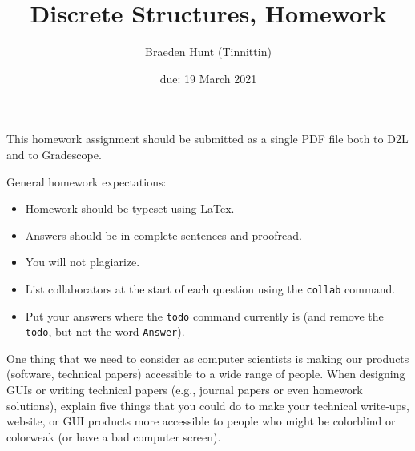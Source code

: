 \documentclass{article}
\title{Discrete Structures, Homework \hwnum}
\author{Braeden Hunt (Tinnittin)}
\date{due: 19 March 2021}
\begin{document}
\maketitle

This homework assignment should be
submitted as a single PDF file both to D2L and to Gradescope.

General homework expectations:
\begin{itemize}
    \item Homework should be typeset using LaTex.
    \item Answers should be in complete sentences and proofread.
    \item You will not plagiarize.
    \item List collaborators at the start of each question using the \texttt{collab} command.
    \item Put your answers where the \texttt{todo} command currently is (and
        remove the \texttt{todo}, but not the word \texttt{Answer}).
\end{itemize}


 

One thing that we need to consider as computer scientists is making our products
(software, technical papers) accessible to a wide range of people. When
designing GUIs or writing technical papers (e.g., journal papers or even
homework solutions), explain five things that you could do to make your
technical write-ups, website, or GUI products more accessible to people who
might be colorblind or colorweak (or have a bad computer screen).
\end{document}
